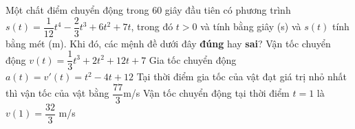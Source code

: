 \begin{ex}%
Một chất điểm chuyển động trong $60$ giây đầu tiên có phương trình $s(t)=\dfrac{1}{12}t^4-\dfrac{2}{3}t^3+6t^2+7t$, trong đó $t>0$ và tính bằng giây (s) và $s(t)$ tính bằng mét (m). Khi đó, các mệnh đề dưới đây \textbf{đúng} hay \textbf{sai}?\choiceTF
{Vận tốc chuyển động $v(t)=\dfrac{1}{3}t^3+2t^2+12t+7$}
{\True 	Gia tốc chuyển động $a(t)=v'(t)=t^2-4t+12$}
{\True Tại thời điểm gia tốc của vật đạt giá trị nhỏ nhất thì vận tốc của vật bằng $\dfrac{77}{3} $m/s}
{Vận tốc chuyển động tại thời điểm $t=1$ là $v(1)=\dfrac{32}{3}$ m/s}
\end{ex}

